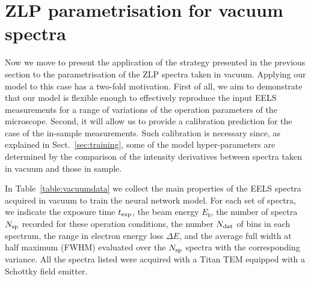 \section{ZLP parametrisation for vacuum spectra}
\label{sec:results_vacuum}

Now we move to present the application of the strategy presented in the previous
section to the parametrisation of the ZLP spectra taken in vacuum.
%
Applying our model to this case has a two-fold motivation.
%
First of all, we aim to demonstrate that our model is flexible enough to effectively reproduce the
input EELS measurements for a range of variations of the operation parameters of the microscope.
%
Second, it will allow us to provide a calibration prediction for the case of the in-sample measurements.
%
Such calibration is necessary since, as explained in Sect.~\ref{sec:training}, some of the model
hyper-parameters are determined by the comparison of the intensity derivatives
between spectra taken in vacuum and those in sample.

In Table~\ref{table:vacuumdata} we collect the main properties of the EELS spectra acquired in vacuum to train the neural
    network model.  For each set of spectra, we indicate the exposure time $t_{\rm exp}$, the beam energy
    $E_b$, the number of spectra $N_{\rm sp}$ recorded for these operation conditions, the number $N_{\rm dat}$ of
    bins in each spectrum, the range in electron energy loss $\Delta E$,
    and the average full width at half maximum (FWHM)
    evaluated over the $N_{\rm sp}$ spectra with the corresponding variance.
    All the spectra listed were acquired with a Titan TEM equipped with a Schottky field emitter.

    

